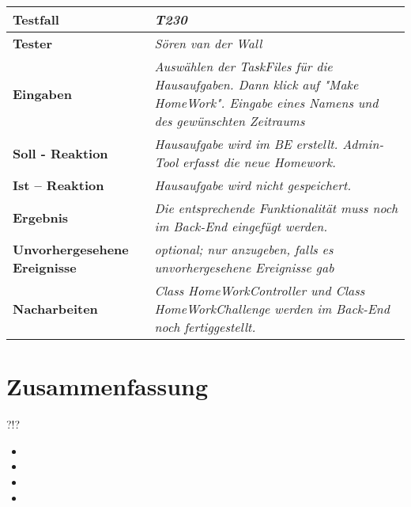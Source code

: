 \begin{longtable}{|p{4cm}|p{11cm}|}
\hline
\textbf{Testfall} & \textit{\textbf{T230}} \\
\hline
\textbf{Tester} & \textit{Sören van der Wall} \\
\hline
\textbf{Eingaben} & \textit{Auswählen der TaskFiles für die Hausaufgaben. Dann klick auf "Make HomeWork". Eingabe eines Namens und des gewünschten Zeitraums} \\
\hline
\textbf{Soll - Reaktion} & \textit{Hausaufgabe wird im BE erstellt. Admin-Tool erfasst die neue Homework. 
} \\
\hline
\textbf{Ist -- Reaktion} & \textit{Hausaufgabe wird nicht gespeichert.} \\
\hline
\textbf{Ergebnis} & \textit{Die entsprechende Funktionalität muss noch im Back-End eingefügt werden.} \\
\hline
\textbf{Unvorhergesehene Ereignisse} &
\textit{optional; nur anzugeben, falls es unvorhergesehene Ereignisse gab} \\
\hline
\textbf{Nacharbeiten } & \textit{Class HomeWorkController und Class HomeWorkChallenge werden im Back-End noch fertiggestellt.} \\
\hline
\end{longtable}

\section{Zusammenfassung}

?!?

\begin{itemize}
\item 
\item 
\item 
\item 
\end{itemize}
